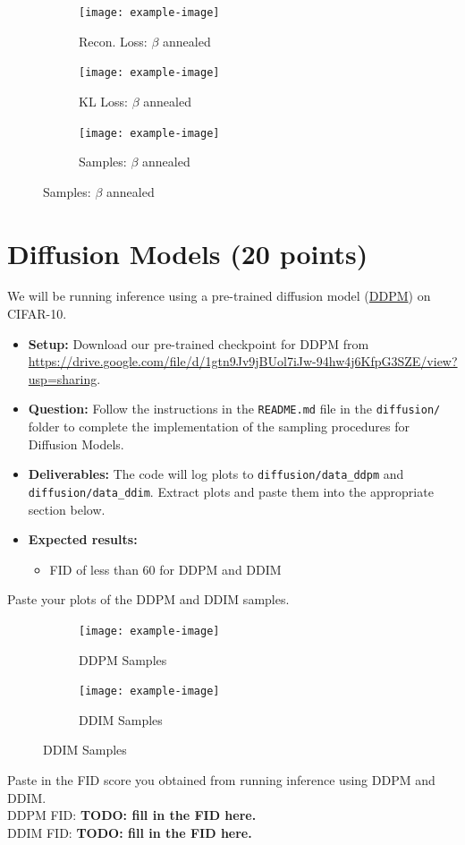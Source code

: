 \documentclass[11pt,addpoints,answers]{exam}
\numberwithin{equation}{section} %
\numberwithin{figure}{section} %
\numberwithin{table}{section} %
\begin{document}
\begin{questions}
\begin{figure}[H]
    \begin{subfigure}[b]{0.32\linewidth}
    \texttt{[image: example-image]}
    \caption{Recon. Loss: $\beta$ annealed}
    \end{subfigure}
    \begin{subfigure}[b]{0.32\linewidth}
    \texttt{[image: example-image]}
    \caption{KL Loss: $\beta$ annealed}
    \end{subfigure}
    \begin{subfigure}[b]{0.32\linewidth}
    \texttt{[image: example-image]}
    \caption{Samples: $\beta$ annealed}
    \end{subfigure}
\end{figure}
\end{questions}
\newpage

\section{Diffusion Models (20 points)}
We will be running inference using a pre-trained diffusion model (\href{https://arxiv.org/abs/2006.11239}{DDPM}) on CIFAR-10. 
\begin{itemize}
\item \textbf{Setup:} Download our pre-trained checkpoint for DDPM from \href{https://drive.google.com/file/d/1gtn9Jv9jBUol7iJw-94hw4j6KfpG3SZE/view?usp=sharing}{https://drive.google.com/file/d/1gtn9Jv9jBUol7iJw-94hw4j6KfpG3SZE/view?usp=sharing}.
\item \textbf{Question:} Follow the instructions in the \texttt{README.md} file in the \texttt{diffusion/} folder to complete the implementation of the sampling procedures for Diffusion Models.
\item \textbf{Deliverables:} The code will log plots to \texttt{diffusion/data\_ddpm} and \texttt{diffusion/data\_ddim}. Extract plots and paste them into the appropriate section below. 
\item \textbf{Expected results:} 
    \begin{itemize}
        \item FID of less than 60 for DDPM and DDIM
    \end{itemize}
\end{itemize}
\begin{questions}
\question Paste your plots of the DDPM and DDIM samples.
\begin{figure}[H]
    \centering
    \begin{subfigure}[b]{0.32\linewidth}
        \texttt{[image: example-image]}
        \caption{DDPM Samples}
    \end{subfigure}
    \begin{subfigure}[b]{0.32\linewidth}
        \texttt{[image: example-image]}
        \caption{DDIM Samples}
    \end{subfigure}
\end{figure}
\question Paste in the FID score you obtained from running inference using DDPM and DDIM.
\\
DDPM FID: \textbf{TODO: fill in the FID here.} \\
DDIM FID: \textbf{TODO: fill in the FID here.} 

\end{questions}
\end{document}
